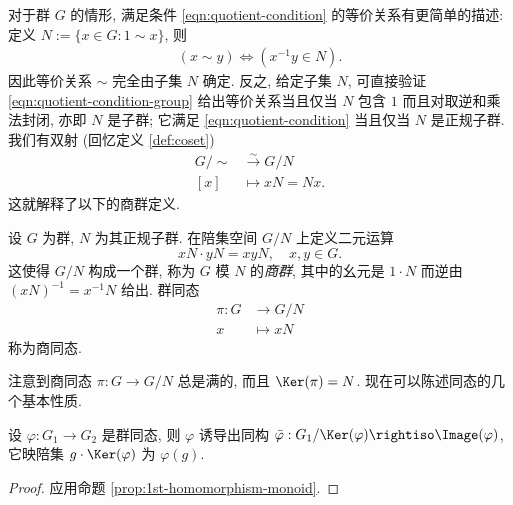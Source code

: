 对于群 $G$ 的情形, 满足条件 \eqref{eqn:quotient-condition} 的等价关系有更简单的描述: 定义 $N := \{x \in G : 1 \sim x\}$, 则
\begin{gather}\label{eqn:quotient-condition-group}
	(x \sim y) \iff \left( x^{-1} y \in N \right).
\end{gather}
因此等价关系 $\sim$ 完全由子集 $N$ 确定. 反之, 给定子集 $N$, 可直接验证 \eqref{eqn:quotient-condition-group} 给出等价关系当且仅当 $N$ 包含 $1$ 而且对取逆和乘法封闭, 亦即 $N$ 是子群; 它满足 \eqref{eqn:quotient-condition} 当且仅当 $N$ 是正规子群. 我们有双射  (回忆定义 \ref{def:coset})
\begin{align*}
	G/\sim & \stackrel{\sim}{\longrightarrow} G/N \\
	[x] & \longmapsto xN = Nx.
\end{align*}
这就解释了以下的商群定义.

\begin{definition}[商群]
	设 $G$ 为群, $N$ 为其正规子群. 在陪集空间 $G/N$ 上定义二元运算
	\[ xN \cdot yN = xy N, \quad x,y \in G. \]
	这使得 $G/N$ 构成一个群, 称为 $G$ 模 $N$ 的\emph{商群}, 其中的幺元是 $1 \cdot N$ 而逆由 $(xN)^{-1} = x^{-1}N$ 给出. 群同态
	\begin{align*}
		\pi: G & \longrightarrow G/N \\
		x & \longmapsto xN
	\end{align*}
	称为商同态.
\end{definition}
注意到商同态 $\pi: G \to G/N$ 总是满的,  而且 $\Ker(\pi) = N$. 现在可以陈述同态的几个基本性质.

\begin{proposition}\label{prop:1st-homomorphism}
	设 $\varphi: G_1 \to G_2$ 是群同态, 则 $\varphi$ 诱导出同构 $\bar{\varphi}: G_1/\Ker(\varphi) \rightiso \Image(\varphi)$, 它映陪集 $g \cdot \Ker(\varphi)$ 为 $\varphi(g)$.
\end{proposition}
\begin{proof}
	应用命题 \ref{prop:1st-homomorphism-monoid}.
\end{proof}

